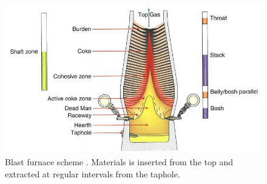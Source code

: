 \begin{figure}[!htb]
\centering
\includegraphics[width=.86\columnwidth]{images/125blastfurnace}
\caption[Blast furnace scheme]{Blast furnace scheme \cite{RefWorks:200}.
Materials is inserted from the top and extracted at regular intervals from the
taphole.}
\label{fig:125blastfurnace}
\end{figure}